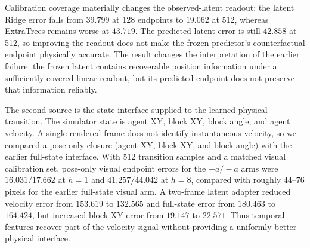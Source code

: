 \documentclass{article}
\begin{document}
\begin{table}[H]
\centering
\scriptsize
\setlength{\tabcolsep}{4pt}
\caption{Calibration-size and decoder-class ablation at $h=8$. Entries are
mean block-XY errors in pixels on the same 72 held-out intervention images
(24 cases times $+a$, $-a$, and zero). The seed-6172 artifact is the
machine-readable source; all intervals are episode-bootstrap intervals.}
\label{tab:supp-observability-decoder-ablation}
\end{table}

Calibration coverage materially changes the observed-latent readout: the
latent Ridge error falls from $39.799$ at 128 endpoints to $19.062$ at 512,
whereas ExtraTrees remains worse at $43.719$. The predicted-latent error is
still $42.858$ at 512, so improving the readout does not make the frozen
predictor's counterfactual endpoint physically accurate. The result changes
the interpretation of the earlier failure: the frozen latent contains
recoverable position information under a sufficiently covered linear readout,
but its predicted endpoint does not preserve that information reliably.

The second source is the state interface supplied to the learned physical
transition. The simulator state is agent XY, block XY, block angle, and agent
velocity. A single rendered frame does not identify instantaneous velocity, so
we compared a pose-only closure (agent XY, block XY, and block angle) with the
earlier full-state interface. With 512 transition samples and a matched visual
calibration set, pose-only visual endpoint errors for the $+a/-a$ arms were
$16.031/17.662$ at $h=1$ and $41.257/44.042$ at $h=8$, compared with roughly
$44$--$76$ pixels for the earlier full-state visual arm. A two-frame latent
adapter reduced velocity error from $153.619$ to $132.565$ and full-state error
from $180.463$ to $164.424$, but increased block-XY error from $19.147$ to
$22.571$. Thus temporal features recover part of the velocity signal without
providing a uniformly better physical interface.
\end{document}
